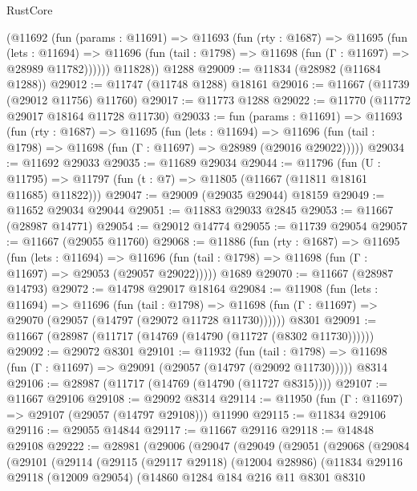 \begin{lexlean}{RustCore}
\begin{coremodule}
        (@11692
          (fun (params : @11691) =>
          @11693
            (fun (rty : @1687) =>
            @11695
              (fun (lets : @11694) =>
              @11696 (fun (tail : @1798) => @11698 (fun (Γ : @11697) => @28989 @11782))))))
        @11828))
    @1288
@29009 := @11834 (@28982 (@11684 @1288))
@29012 := @11747 (@11748 @1288) @18161
@29016 := @11667 (@11739 (@29012 @11756) @11760)
@29017 := @11773 @1288
@29022 := @11770 (@11772 @29017 @18164 @11728 @11730)
@29033 := fun (params : @11691) =>
  @11693
    (fun (rty : @1687) =>
    @11695
      (fun (lets : @11694) =>
      @11696 (fun (tail : @1798) => @11698 (fun (Γ : @11697) => @28989 (@29016 @29022)))))
@29034 := @11692 @29033
@29035 := @11689 @29034
@29044 := @11796
    (fun (U : @11795) => @11797 (fun (t : @7) => @11805 (@11667 (@11811 @18161 @11685) @11822)))
@29047 := @29009 (@29035 @29044) @18159
@29049 := @11652 @29034 @29044
@29051 := @11883 @29033 @2845
@29053 := @11667 (@28987 @14771)
@29054 := @29012 @14774
@29055 := @11739 @29054
@29057 := @11667 (@29055 @11760)
@29068 := @11886
    (fun (rty : @1687) =>
    @11695
      (fun (lets : @11694) =>
      @11696 (fun (tail : @1798) => @11698 (fun (Γ : @11697) => @29053 (@29057 @29022)))))
    @1689
@29070 := @11667 (@28987 @14793)
@29072 := @14798 @29017 @18164
@29084 := @11908
    (fun (lets : @11694) =>
    @11696
      (fun (tail : @1798) =>
      @11698 (fun (Γ : @11697) => @29070 (@29057 (@14797 (@29072 @11728 @11730))))))
    @8301
@29091 := @11667 (@28987 (@11717 (@14769 (@14790 (@11727 (@8302 @11730))))))
@29092 := @29072 @8301
@29101 := @11932
    (fun (tail : @1798) => @11698 (fun (Γ : @11697) => @29091 (@29057 (@14797 (@29092 @11730)))))
    @8314
@29106 := @28987 (@11717 (@14769 (@14790 (@11727 @8315))))
@29107 := @11667 @29106
@29108 := @29092 @8314
@29114 := @11950 (fun (Γ : @11697) => @29107 (@29057 (@14797 @29108))) @11990
@29115 := @11834 @29106
@29116 := @29055 @14844
@29117 := @11667 @29116
@29118 := @14848 @29108
@29222 := @28981
    (@29006
      (@29047
        (@29049
          (@29051
            (@29068
              (@29084
                (@29101
                  (@29114
                    (@29115
                      (@29117 @29118)
                      (@12004 @28986)
                      (@11834
                        @29116
                        @29118
                        (@12009 @29054)
                        (@14860
                          @1284
                          @184
                          @216
                          @11
                          @8301
                          @8310

\end{coremodule}
\end{lexlean}
